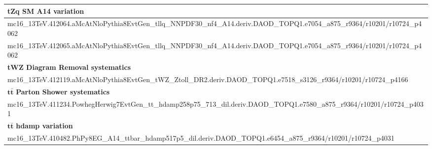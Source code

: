 \begin{table}[htbp]
\begin{adjustwidth}{-1.1cm}{}
\begin{tabular}{l}
		\hline
		\textbf{tZq SM  A14 variation} \\
		\hline
		mc16\_13TeV.412064.aMcAtNloPythia8EvtGen\_tllq\_NNPDF30\_nf4\_A14.deriv.DAOD\_TOPQ1.e7054\_a875\_r9364/r10201/r10724\_p4062 \\
		mc16\_13TeV.412065.aMcAtNloPythia8EvtGen\_tllq\_NNPDF30\_nf4\_A14.deriv.DAOD\_TOPQ1.e7054\_a875\_r9364/r10201/r10724\_p4062 \\
		\hline
		\textbf{tWZ Diagram Removal systematics} \\
		\hline
		mc16\_13TeV.412119.aMcAtNloPythia8EvtGen\_tWZ\_Ztoll\_DR2.deriv.DAOD\_TOPQ1.e7518\_s3126\_r9364/r10201/r10724\_p4166 \\
		\hline
		$\mathbf{t\bar{t}}$ \textbf{Parton Shower systematics}  \\
		\hline
		mc16\_13TeV.411234.PowhegHerwig7EvtGen\_tt\_hdamp258p75\_713\_dil.deriv.DAOD\_TOPQ1.e7580\_a875\_r9364/r10201/r10724\_p4031 \\
		\hline
		$\mathbf{t\bar{t}}$ \textbf{hdamp variation} \\
		\hline
		mc16\_13TeV.410482.PhPy8EG\_A14\_ttbar\_hdamp517p5\_dil.deriv.DAOD\_TOPQ1.e6454\_a875\_r9364/r10201/r10724\_p4031 \\
		\bottomrule
	\end{tabular}
	 \end{adjustwidth}
\end{table}
